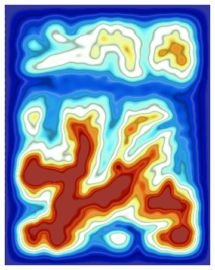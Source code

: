 \documentclass[mat2, tisk]{fmfdelo}
\begin{document}
\begin{figure}[h!]
  \centering
  \begin{subfigure}[b]{0.48\textwidth}
      \centering
      \includegraphics[width=\textwidth]{rezultati/dem_planica.png}
      \label{fig:dem_planica}
  \end{subfigure}
  \hfill
  \begin{subfigure}[b]{0.48\textwidth}
      \centering

\end{subfigure}
\end{figure}
\end{document}
